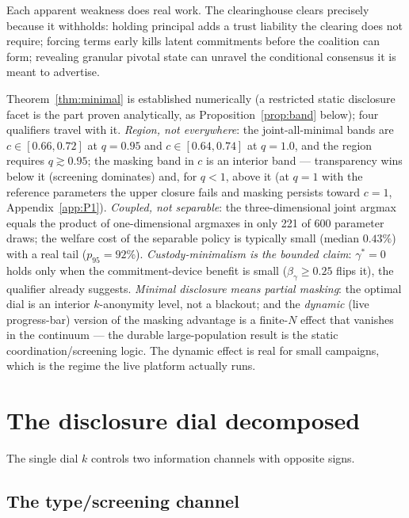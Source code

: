 \documentclass[11pt]{article}
\theoremstyle{definition}
\theoremstyle{remark}
\begin{document}
Each apparent weakness does real work. The clearinghouse clears precisely because it
withholds: holding principal adds a trust liability the clearing does not require; forcing
terms early kills latent commitments before the coalition can form; revealing granular
pivotal state can unravel the conditional consensus it is meant to advertise.

Theorem~\ref{thm:minimal} is established numerically (a restricted static disclosure facet
is the part proven analytically, as Proposition~\ref{prop:band} below); four qualifiers travel with
it. \emph{Region, not everywhere}: the joint-all-minimal bands are $c\in[0.66,0.72]$ at
$q=0.95$ and $c\in[0.64,0.74]$ at $q=1.0$, and the region requires $q \gtrsim 0.95$; the
masking band in $c$ is an interior band --- transparency wins below it (screening
dominates) and, for $q<1$, above it (at $q=1$ with the reference parameters the upper
closure fails and masking persists toward $c=1$, Appendix~\ref{app:P1}). \emph{Coupled, not separable}:
the three-dimensional joint argmax equals the product of one-dimensional argmaxes in only
221 of 600 parameter draws; the welfare cost of the separable policy is typically small
(median $0.43\%$) with a real tail ($p_{95}=92\%$). \emph{Custody-minimalism is the
bounded claim}: $\gamma^*=0$ holds only when the commitment-device benefit is small
($\beta_\gamma \ge 0.25$ flips it), the qualifier \citet{diamond1984delegated} already
suggests. \emph{Minimal disclosure means partial masking}: the optimal dial is an interior
$k$-anonymity level, not a blackout; and the \emph{dynamic} (live progress-bar) version of
the masking advantage is a finite-$N$ effect that vanishes in the continuum --- the durable
large-population result is the static coordination/screening logic. The dynamic effect is
real for small campaigns, which is the regime the live platform actually runs.

\section{The disclosure dial decomposed}\label{sec:dial}

The single dial $k$ controls two information channels with opposite signs.

\subsection{The type/screening channel}
\end{document}
